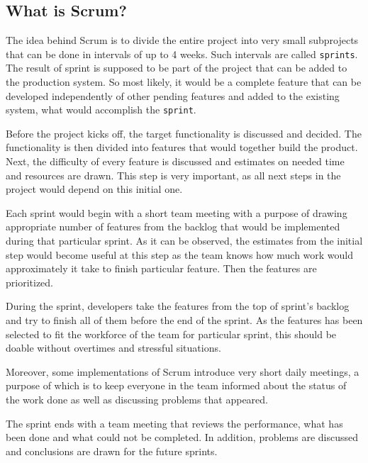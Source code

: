    \subsection{What is Scrum?}
      The idea behind Scrum is to divide the entire project into very small subprojects that can be done in
      intervals of up to 4 weeks. Such intervals are called \texttt{sprints}. The result of sprint is
      supposed to be part of the project that can be added to the production system. So most likely, it would
      be a complete feature that can be developed independently of other pending features and added to the
      existing system, what would accomplish the \texttt{sprint}.

      Before the project kicks off, the target functionality is discussed and decided. The functionality is
      then divided into features that would together build the product. Next, the difficulty of every feature
      is discussed and estimates on needed time and resources are drawn. This step is very important, as
      all next steps in the project would depend on this initial one.

      Each sprint would begin with a short team meeting with a purpose of drawing appropriate number
      of features from the backlog that would be implemented during that particular sprint. As it can be
      observed, the estimates from the initial step would become useful at this step as the team
      knows how much work would approximately it take to finish particular feature. Then the features are
      prioritized.

      During the sprint, developers take the features from the top of sprint's backlog and try to finish
      all of them before the end of the sprint. As the features has been selected to fit the workforce of the
      team for particular sprint, this should be doable without overtimes and stressful situations.

      Moreover, some implementations of Scrum introduce very short daily meetings, a purpose of which is
      to keep everyone in the team informed about the status of the work done as well as discussing problems
      that appeared.

      The sprint ends with a team meeting that reviews the performance, what has been done and what could not
      be completed. In addition, problems are discussed and conclusions are drawn for the future sprints.

